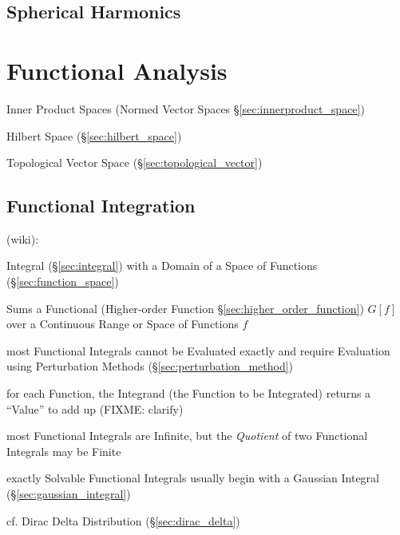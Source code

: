 \subsection{Spherical Harmonics}\label{sec:spherical_harmonics}



\section{Functional Analysis}\label{sec:functional_analysis}

Inner Product Spaces (Normed Vector Spaces
\S\ref{sec:innerproduct_space})

Hilbert Space (\S\ref{sec:hilbert_space})

Topological Vector Space (\S\ref{sec:topological_vector})



\subsection{Functional Integration}\label{sec:functional_integration}

(wiki):

Integral (\S\ref{sec:integral}) with a Domain of a Space of Functions
(\S\ref{sec:function_space})

Sums a Functional (Higher-order Function \S\ref{sec:higher_order_function})
$G[f]$ over a Continuous Range or Space of Functions $f$

most Functional Integrals cannot be Evaluated exactly and require Evaluation
using Perturbation Methods (\S\ref{sec:perturbation_method})

for each Function, the Integrand (the Function to be Integrated) returns a
``Value'' to add up (FIXME: clarify)

most Functional Integrals are Infinite, but the \emph{Quotient} of two
Functional Integrals may be Finite

exactly Solvable Functional Integrals usually begin with a Gaussian Integral
(\S\ref{sec:gaussian_integral})

cf. Dirac Delta Distribution (\S\ref{sec:dirac_delta})

